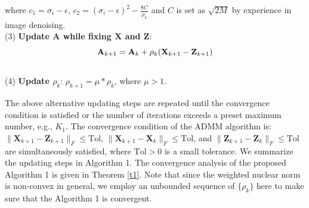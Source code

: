 \documentclass[10pt,twocolumn,letterpaper,sort&compress]{article}
\begin{document}
where $c_{1}=\sigma_{i}-\epsilon$, $c_{2} = (\sigma_{i}-\epsilon)^{2}-\frac{8C}{\rho_{k}}$ and $C$ is set as $\sqrt{2M}$ by experience in image denoising.
 \\
(3) \textbf{Update $\mathbf{A}$ while fixing $\mathbf{X}$ and $\mathbf{Z}$}:
\vspace{-1mm}
\begin{equation}
\label{e17}
\vspace{-3mm}
\mathbf{A}_{k+1}
=
\mathbf{A}_{k} + \rho_{k}(\mathbf{X}_{k+1}-\mathbf{Z}_{k+1})
\end{equation}
\\
(4) \textbf{Update $\rho_{k}$}: $\rho_{k+1}= \mu * \rho_{k}$, where $\mu>1$.

The above alternative updating steps are repeated until the convergence condition is satisfied or the number of iterations exceeds a preset maximum number, e.g., $K_{1}$. The convergence condition of the ADMM algorithm is: $\|\mathbf{X}_{k+1}-\mathbf{Z}_{k+1}\|_{F}\le \text{Tol}$, $\|\mathbf{X}_{k+1}-\mathbf{X}_{k}\|_{F}\le \text{Tol}$, and $\|\mathbf{Z}_{k+1}-\mathbf{Z}_{k}\|_{F}\le \text{Tol}$ are simultaneously satisfied, where $\text{Tol}>0$ is a small tolerance. We summarize the updating steps in Algorithm 1. The convergence analysis of the proposed Algorithm 1 is given in Theorem \ref{t1}. Note that since the weighted nuclear norm is non-convex in general, we employ an unbounded sequence of $\{\rho_{k}\}$ here to make sure that the Algorithm 1 is convergent. 
\end{document}

